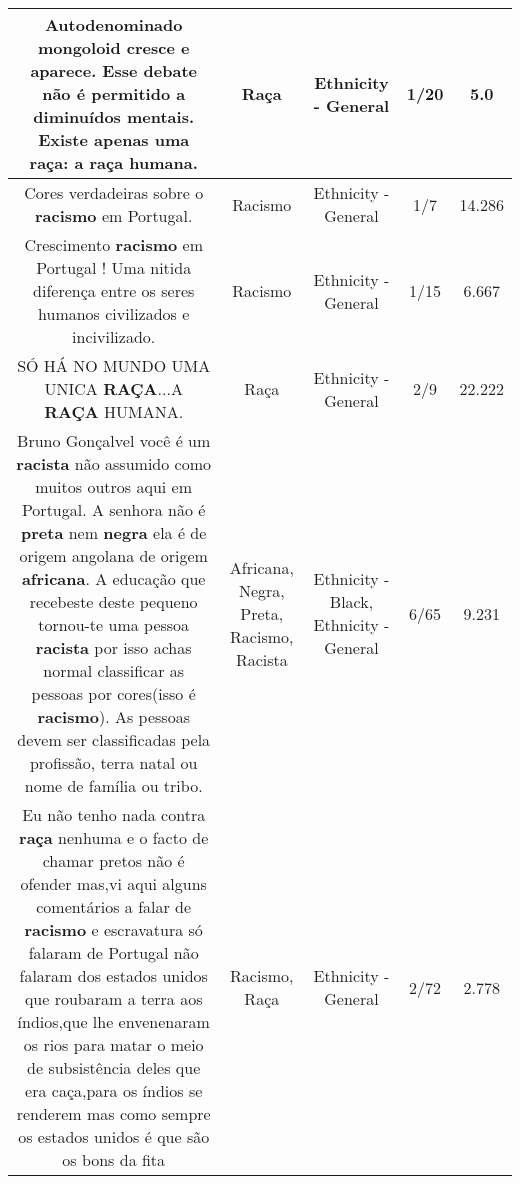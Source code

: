 \documentclass[11pt]{article}
\newlength\mylength
\begin{document}
\begin{center}
\begin{longtable}{|C{.65\mylength}|C{.30\mylength}|C{.12\mylength}|C{.12\mylength}|C{.12\mylength}|}
  \small Autodenominado mongoloid cresce e aparece. Esse debate não é permitido a diminuídos mentais. Existe apenas uma \textbf{raça}: a \textbf{raça} humana.\normalsize   & Raça & Ethnicity - General & 1/20 & 5.0 \\  \hline
  \small Cores verdadeiras sobre o \textbf{racismo} em Portugal.\normalsize   & Racismo & Ethnicity - General & 1/7 & 14.286 \\  \hline
  \small Crescimento \textbf{racismo} em Portugal ! Uma  nitida diferença entre os seres humanos civilizados e incivilizado.\normalsize   & Racismo & Ethnicity - General & 1/15 & 6.667 \\  \hline
  \small SÓ HÁ NO MUNDO UMA UNICA \textbf{RAÇA}...A \textbf{RAÇA} HUMANA.\normalsize   & Raça & Ethnicity - General & 2/9 & 22.222 \\  \hline
  \small Bruno Gonçalvel você é um \textbf{racista} não assumido como muitos outros aqui em Portugal. A senhora não é \textbf{preta} nem \textbf{negra} ela é de origem angolana de origem \textbf{africana}. A educação que recebeste deste pequeno tornou-te uma pessoa \textbf{racista} por isso achas normal classificar as pessoas por cores(isso é \textbf{racismo}). As pessoas devem ser classificadas pela profissão, terra natal ou nome de família ou tribo.\normalsize   & Africana, Negra, Preta, Racismo, Racista & Ethnicity - Black, Ethnicity - General & 6/65 & 9.231 \\  \hline
  \small Eu não tenho nada contra \textbf{raça} nenhuma e o facto de chamar pretos não é ofender mas,vi aqui alguns comentários a falar de \textbf{racismo} e escravatura só falaram de Portugal não falaram dos estados unidos que roubaram a terra aos índios,que lhe envenenaram os rios para matar o meio de subsistência deles que era caça,para os índios se renderem mas como sempre os estados unidos é que são os bons da fita\normalsize   & Racismo, Raça & Ethnicity - General & 2/72 & 2.778 \\  \hline

\end{longtable}
\end{center}
\end{document}
